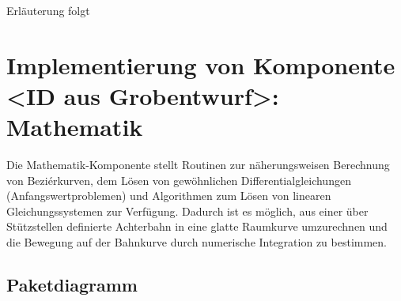 Erläuterung folgt

\section{Implementierung von Komponente
         <ID aus Grobentwurf>: Mathematik}

Die Mathematik-Komponente stellt Routinen zur näherungsweisen Berechnung
von Beziérkurven, dem Lösen von gewöhnlichen Differentialgleichungen 
(Anfangswertproblemen) und Algorithmen zum Lösen von linearen Gleichungssystemen
zur Verfügung. Dadurch ist es möglich, aus einer über Stützstellen definierte 
Achterbahn in eine glatte Raumkurve umzurechnen und die Bewegung auf
der Bahnkurve durch numerische Integration zu bestimmen.

\subsection{Paketdiagramm}

